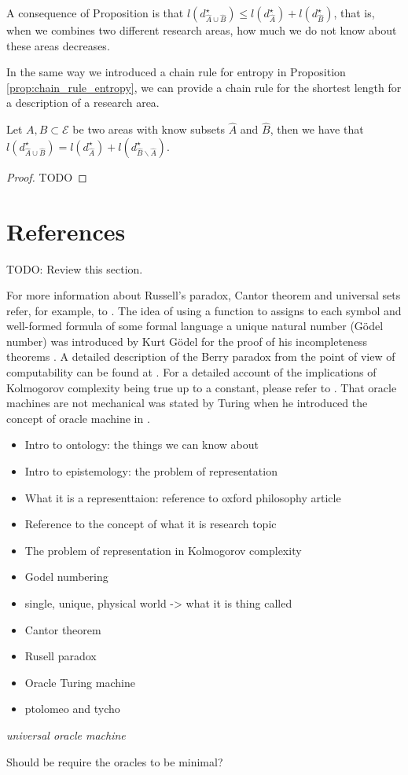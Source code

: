 A consequence of Proposition \label{prop:areas_union} is that $l \left( d_{\hat{A} \cup \hat{B}}^{\star} \right) \leq l \left( d_{\hat{A}}^{\star} \right) + l \left( d_{\hat{B}}^{\star} \right)$, that is, when we combines two different research areas, how much we do not know about these areas decreases.

In the same way we introduced a chain rule for entropy in Proposition \ref{prop:chain_rule_entropy}, we can provide a chain rule for the shortest length for a description of a research area.

\begin{proposition}
Let $A, B \subset \mathcal{E}$ be two areas with know subsets $\hat{A}$ and $\hat{B}$, then we have that $l \left( d_{\hat{A} \cup \hat{B}}^{\star} \right) = l \left( d_{\hat{A}}^{\star} \right) + l \left( d_{\hat{B} \backslash \hat{A}}^{\star} \right)$.
\end{proposition}
\begin{proof}
{\color{red} TODO}
\end{proof}

%
%

\section{References}

{\color{red} TODO: Review this section.}

For more information about Russell's paradox, Cantor theorem and universal sets refer, for example, to \cite{jech2013set}. The idea of using a function to assigns to each symbol and well-formed formula of some formal language a unique natural number (Gödel number) was introduced by Kurt Gödel for the proof of his incompleteness theorems \cite{godel1931formal}. A detailed description of the Berry paradox from the point of view of computability can be found at \cite{chaitin1995berry}. For a detailed account of the implications of Kolmogorov complexity being true up to a constant, please refer to \cite{li2013introduction}. That oracle machines are not mechanical was stated by Turing when he introduced the concept of oracle machine in \cite{turing1939systems}.

\begin{itemize}
\item Intro to ontology: the things we can know about
\item Intro to epistemology: the problem of representation
\item What it is a representtaion: reference to oxford philosophy article
\item Reference to the concept of what it is research topic
\item The problem of representation in Kolmogorov complexity
\item Godel numbering
\item single, unique, physical world -> what it is thing called
\item Cantor theorem
\item Rusell paradox
\item Oracle Turing machine
\item ptolomeo and tycho
\end{itemize}

\emph{universal oracle machine}

Should be require the oracles to be minimal?